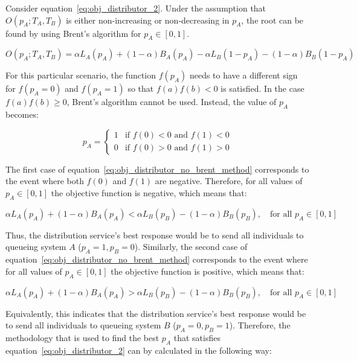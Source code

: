 Consider equation~\eqref{eq:obj_distributor_2}.
Under the assumption that \(O(p_A; T_A, T_B)\) is either non-increasing or
non-decreasing in \(p_A\), the root can be found by using Brent's algorithm
for \(p_A \in [0, 1]\).

\begin{equation*}
    O(p_A; T_A, T_B) = \alpha L_A(p_A) + (1 - \alpha) B_A(p_A) -
    \alpha L_B(1 - p_A) - (1 - \alpha)B_B(1 - p_A)
\end{equation*}

For this particular scenario, the function \(f(p_A)\) needs to have a different
sign for \(f(p_A = 0)\) and \(f(p_A = 1)\) so that \(f(a)f(b) < 0\) is
satisfied.
In the case \(f(a)f(b) \geq 0\), Brent's algorithm cannot be used.
Instead, the value of \(p_A\) becomes:

\begin{equation}\label{eq:obj_distributor_no_brent_method}
    p_A = \begin{cases}
        1 & \text{if } f(0) < 0 \text{ and } f(1) < 0 \\
        0 & \text{if } f(0) > 0 \text{ and } f(1) > 0
    \end{cases}
\end{equation}

The first case of equation~\eqref{eq:obj_distributor_no_brent_method}
corresponds to the event where both \(f(0)\) and \(f(1)\) are negative.
Therefore, for all values of \(p_A \in [0, 1]\) the objective function is
negative, which means that:

\[
    \alpha L_A(p_A) + (1 - \alpha) B_A(p_A) <
    \alpha L_B(p_B) - (1 - \alpha) B_B(p_B), \quad \text{for all } p_A \in [0,1]
\]

Thus, the distribution service's best response would be to send all individuals
to queueing system \(A\) (\(p_A=1, p_B=0\)).
Similarly, the second case of
equation~\eqref{eq:obj_distributor_no_brent_method} corresponds to the event
where for all values of \(p_A \in [0, 1]\) the objective function is
positive, which means that:

\[
    \alpha L_A(p_A) + (1 - \alpha) B_A(p_A) >
    \alpha L_B(p_B) - (1 - \alpha) B_B(p_B), \quad \text{for all } p_A \in [0,1]
\]

Equivalently, this indicates that the distribution service's best response
would be to send all individuals to queueing system \(B\) (\(p_A=0, p_B=1\)).
Therefore, the methodology that is used to find the best \(p_A\) that satisfies
equation~\eqref{eq:obj_distributor_2} can by calculated in the following way:

